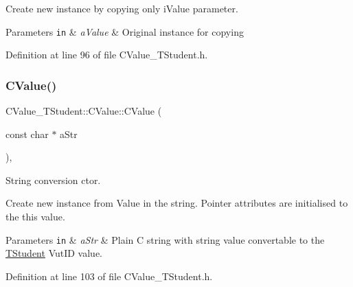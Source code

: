 Create new instance by copying only {\ttfamily i\+Value} parameter. 
\begin{DoxyParams}[1]{Parameters}
\mbox{\tt in}  & {\em a\+Value} & Original instance for copying \\
\hline
\end{DoxyParams}


Definition at line 96 of file C\+Value\+\_\+\+T\+Student.\+h.

\mbox{\label{class_c_value___t_student_1_1_c_value_a488e8a348d17591900a6dabe3525b797}} 
\subsubsection{\texorpdfstring{C\+Value()}{CValue()}\hspace{0.1cm}{\footnotesize\ttfamily [4/4]}}
{\footnotesize\ttfamily C\+Value\+\_\+\+T\+Student\+::\+C\+Value\+::\+C\+Value (\begin{DoxyParamCaption}\item[{const char $\ast$}]{a\+Str }\end{DoxyParamCaption})\hspace{0.3cm}{\ttfamily [inline]}, {\ttfamily [explicit]}}



String conversion c\textquotesingle{}tor. 

Create new instance from Value in the string. Pointer attributes are initialised to the {\ttfamily this} value. 
\begin{DoxyParams}[1]{Parameters}
\mbox{\tt in}  & {\em a\+Str} & Plain C string with string value convertable to the \hyperlink{struct_c_value___t_student_1_1_t_student}{T\+Student} Vut\+ID value. \\
\hline
\end{DoxyParams}


Definition at line 103 of file C\+Value\+\_\+\+T\+Student.\+h.

\mbox{\label{class_c_value___t_student_1_1_c_value_a2a4f5cdb7acace3f45674d4170ca4193}} 

